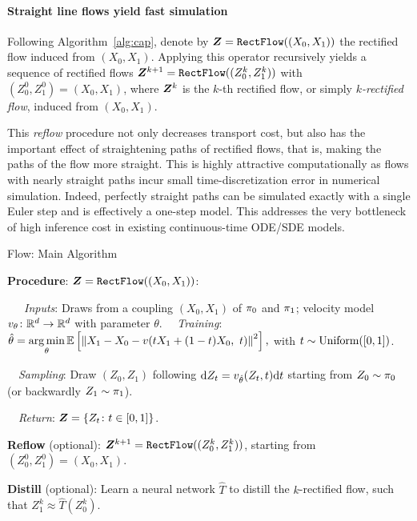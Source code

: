  



\paragraph{Straight line flows yield fast simulation}
Following Algorithm~\ref{alg:cap}, 
denote by ${\boldsymbol{Z}} = \mathtt{RectFlow}((X_0,X_1))$ the rectified flow induced from $(X_0,X_1)$. 
Applying this operator recursively 
yields a sequence of rectified  flows 
${\boldsymbol{Z}}^{k+1} = \mathtt{RectFlow}((Z_0^k, Z_1^k))$ with $(Z_0^0,Z_1^0)=(X_0,X_1)$, where ${\boldsymbol{Z}}^k$ is the $k$-th rectified flow, or simply \emph{$k$-rectified flow}, induced from $(X_0,X_1)$. 

This 
\emph{reflow} 
procedure %
not only decreases transport cost,
but also has the important effect of 
straightening paths of rectified flows, 
that is, making the paths of the flow more straight. 
This is highly attractive computationally  
as flows with nearly straight paths 
incur small time-discretization error 
in numerical simulation. Indeed, perfectly straight paths can be simulated exactly with a single Euler step and is effectively a one-step model. 
This addresses the very bottleneck of high inference cost 
in existing continuous-time ODE/SDE models.  














\begin{algorithm}[t]
\caption{{\Name} Flow: Main Algorithm}\label{alg:cap}
\begin{algorithmic}
\STATE \textbf{Procedure}: ${\boldsymbol{Z}}={\mathtt{RectFlow}((X_0,X_1))}$: 
\vspace{.2\baselineskip}


\STATE~~~\emph{Inputs}: Draws from a coupling $(X_0,X_1)$ of ${\pi}_0$ and ${\pi}_1$; velocity model $v_\theta \colon \mathbb{R}^d \to \mathbb{R}^d$ with parameter $\theta.$ 
\vspace{.155\baselineskip}
\STATE~~\emph{Training}:
$
\displaystyle 
\hat \theta = \operatorname*{arg\,min}_\theta
\mathbb{E}\left [\left\lVert X_1 - X_0 - v(t X_1 +(1-t)X_0, ~t )\right\rVert^2 \right], 
$
with $t \sim \textrm{Uniform}([0,1])$.
\vspace{.15\baselineskip}


\STATE~~\emph{Sampling}: Draw $(Z_0,Z_1)$ following $\mathrm{d} Z_t = v_{\hat\theta}(Z_t,t)\mathrm{d}t$ starting from $Z_0 \sim {\pi}_0$ (or backwardly $Z_1\sim {\pi}_1$).


\STATE~~\emph{Return}: ${\boldsymbol{Z}} = \{Z_t\colon t\in[0,1]\}$.
\vspace{.4\baselineskip}


\STATE \textbf{Reflow} (optional): $%
\vv Z^{k+1} = \rectifyflow((Z_0^k, Z_1^k))$, starting from $(Z^0_0,Z^0_1) = (X_0,X_1)$.
\vspace{.2\baselineskip}

\STATE \textbf{Distill} (optional): Learn a neural network $\hat T$ to distill the $k$-rectified flow, such that $Z^k_1 \approx \hat T(Z^k_0)$. 
\end{algorithmic}
\end{algorithm}



